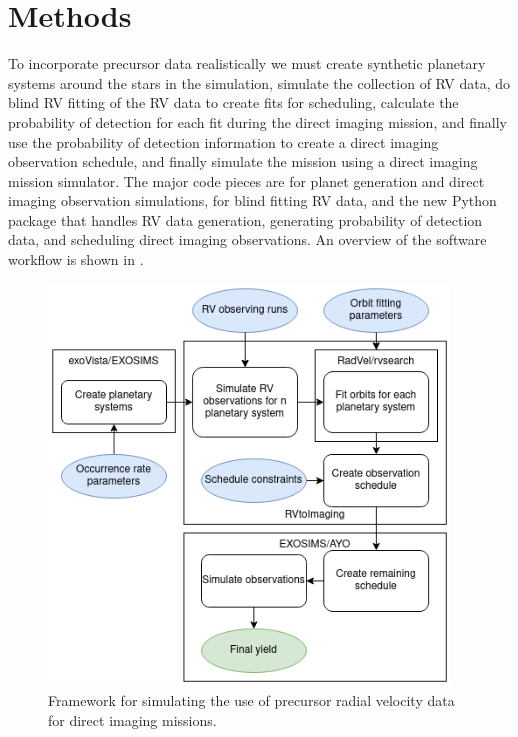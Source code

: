 \section{Methods}
To incorporate precursor data realistically we must create synthetic planetary
systems around the stars in the simulation, simulate the collection of RV data,
do blind RV fitting of the RV data to create fits for scheduling, calculate the
probability of detection for each fit during the direct imaging mission, and
finally use the probability of detection information to create a direct imaging
observation schedule, and finally simulate the mission using a direct imaging
mission simulator. The major code pieces are  for planet
generation and direct imaging observation simulations,  for
blind fitting RV data, and the new Python package  that
handles RV data generation, generating probability of detection data, and
scheduling direct imaging observations. An overview of the software workflow is
shown in .

\begin{figure}
  \begin{center}
    \includegraphics[width=0.95\textwidth]{ch4/figures/flowchartwhite.png}
  \end{center}
  \caption{Framework for simulating the use of precursor radial velocity data
  for direct imaging missions.}
  \label{fig:rv2imgflowchart}
\end{figure}

